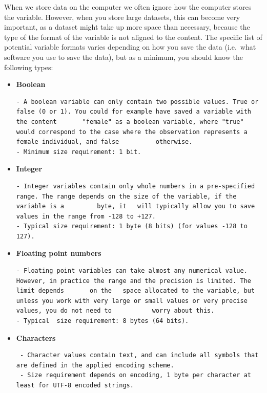 \documentclass[
]{book}
\begin{document}
When we store data on the computer we often ignore how the computer stores the variable. However, when you store large datasets, this can become very important, as a dataset might take up more space than necessary, because the type of the format of the variable is not aligned to the content.
The specific list of potential variable formats varies depending on how you save the data (i.e.~what software you use to save the data), but as a minimum, you should know the following types:

\begin{itemize}
\item
  \textbf{Boolean}

\begin{verbatim}
- A boolean variable can only contain two possible values. True or false (0 or 1). You could for example have saved a variable with the content       "female" as a boolean variable, where "true" would correspond to the case where the observation represents a female individual, and false          otherwise. 
- Minimum size requirement: 1 bit.
\end{verbatim}
\item
  \textbf{Integer}

\begin{verbatim}
- Integer variables contain only whole numbers in a pre-specified range. The range depends on the size of the variable, if the variable is a         byte, it   will typically allow you to save values in the range from -128 to +127.
- Typical size requirement: 1 byte (8 bits) (for values -128 to 127).
\end{verbatim}
\item
  \textbf{Floating point numbers}

\begin{verbatim}
- Floating point variables can take almost any numerical value. However, in practice the range and the precision is limited. The limit depends       on the   space allocated to the variable, but unless you work with very large or small values or very precise values, you do not need to           worry about this.
- Typical  size requirement: 8 bytes (64 bits).
\end{verbatim}
\item
  \textbf{Characters}

\begin{verbatim}
 - Character values contain text, and can include all symbols that are defined in the applied encoding scheme.
 - Size requirement depends on encoding, 1 byte per character at least for UTF-8 encoded strings.
\end{verbatim}
\end{itemize}
\end{document}
